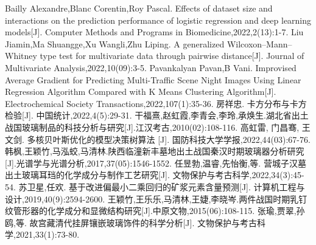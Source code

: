 \documentclass[withoutpreface,bwprint]{cumcmthesis} %
\begin{document}
\newpage

\begin{thebibliography}{100}

 Bailly Alexandre,Blanc Corentin,Roy Pascal. Effects of dataset size and interactions on the prediction performance of logistic regression and deep learning models[J]. Computer Methods and Programs in Biomedicine,2022,2(13):1-7.
Liu Jiamin,Ma Shuangge,Xu Wangli,Zhu Liping. A generalized Wilcoxon–Mann–Whitney type test for multivariate data through pairwise distance[J]. Journal of Multivariate Analysis,2022,10(09):3-5.
Pavankalyan Pavan,B Vani. Improvised Average Gradient for Predicting Multi-Traffic Scene Night Images Using Linear Regression Algorithm Compared with K Means Clustering Algorithm[J]. Electrochemical Society Transactions,2022,107(1):35-36.
房祥忠. 卡方分布与卡方检验[J]. 中国统计,2022,4(5):29-31. 
干福熹,赵虹霞,李青会,李玲,承焕生.湖北省出土战国玻璃制品的科技分析与研究[J].江汉考古,2010(02):108-116.
高虹雷, 门昌骞, 王文剑. 多核贝叶斯优化的模型决策树算法 [J]. 国防科技大学学报,2022,44(03):67-76.
韩枫,王颖竹,马泓蛟,马清林.陕西临潼新丰墓地出土战国秦汉时期玻璃器分析研究[J].光谱学与光谱分析,2017,37(05):1546-1552.
 任昱勃,温睿,先怡衡,等. 营城子汉墓出土玻璃耳珰的化学成分与制作工艺研究[J]. 文物保护与考古科学,2022,34(3):45-54. 
 苏卫星,任欢. 基于改进偏最小二乘回归的矿浆元素含量预测[J]. 计算机工程与设计,2019,40(9):2594-2600.
王颖竹,王乐乐,马清林,王婕,李晓岑.两件战国时期乳钉纹管形器的化学成分和显微结构研究[J].中原文物,2015(06):108-115.
 张瑜,贾翠,孙鸥,等. 故宫藏清代挂屏镶嵌玻璃饰件的科学分析[J]. 文物保护与考古科学,2021,33(1):73-80. 

\end{thebibliography}
\end{document}
